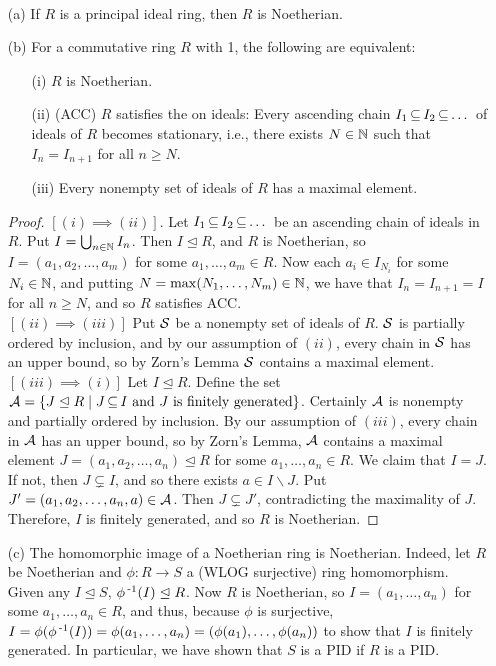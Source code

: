 \documentclass[11pt]{book}
\theoremstyle{definition}   \newtheorem{defn}[counter]{Definition} %
\newcommand{\bs}{\backslash}   \newcommand{\A}{\mathcal{A}}   \newcommand{\sy}{\textnormal{Syl}}   \newcommand{\size}[1]{\left| #1 \right|}
\newcommand{\nsg}{\mathrel{\unlhd}}   \newcommand{\ind}{\parindent24pt}   \newcommand{\vn}{\varnothing}
\DeclareMathOperator{\ra}{\rightarrow}   \DeclareMathOperator{\Poly}{\mathbf{P}}   \DeclareMathOperator{\spn}{\textnormal{span}}   \DeclareMathOperator{\aut}{\textnormal{Aut}}
\numberwithin{counter}{chapter}
\begin{document}
\begin{remark} \
\begin{enumerate}
\item[(a)] If $R$ is a principal ideal ring, then $R$ is Noetherian.
\item[(b)] For a commutative ring $R$ with 1, the following are equivalent:
	\begin{enumerate}
	\item[(i)] $R$ is Noetherian.
	\item[(ii)] (ACC) $R$ satisfies the  on ideals: Every ascending chain $I_1 \operatorname{\subseteq} I_2 \operatorname{\subseteq} \dots$ of ideals of $R$ becomes stationary, i.e., there exists $N \in \operatorname{\mathbb{N}}$ such that $I_n = I_{n+1}$ for all $n \geq N$.
	\item[(iii)] Every nonempty set of ideals of $R$ has a maximal element.
	\end{enumerate}
\begin{proof}
$[(i) \implies (ii)]$. Let $I_1 \operatorname{\subseteq} I_2 \operatorname{\subseteq} \dots$ be an ascending chain of ideals in $R$. Put $I = \bigcup_{n \in \operatorname{\mathbb{N}}} I_n$. Then $I \nsg R$, and $R$ is Noetherian, so $I = (a_1,a_2,\dots,a_m)$ for some $a_1,\dots,a_m \in R$. Now each $a_i \in I_{N_i}$ for some $N_i \in \operatorname{\mathbb{N}}$, and putting $N = \max(N_1,\dots,N_m) \in \operatorname{\mathbb{N}}$, we have that $I_n = I_{n+1} = I$ for all $n \geq N$, and so $R$ satisfies ACC. \\

$[(ii) \implies (iii)]$ Put $\mathcal{S}$ be a nonempty set of ideals of $R$. $\mathcal{S}$ is partially ordered by inclusion, and by our assumption of $(ii)$, every chain in $\mathcal{S}$ has an upper bound, so by Zorn's Lemma $\mathcal{S}$ contains a maximal element. \\

$[(iii) \implies (i)]$ Let $I \nsg R$. Define the set $\mc{A} = \{J \nsg R \mid J \sub I \tn{ and $J$ is finitely generated}\}$. Certainly $\mathcal{A}$ is nonempty and partially ordered by inclusion. By our assumption of $(iii)$, every chain in $\mathcal{A}$ has an upper bound, so by Zorn's Lemma, $\mathcal{A}$ contains a maximal element $J = (a_1,a_2,\dots,a_n) \nsg R$ for some $a_1,\dots,a_n \in R$. We claim that $I = J$. If not, then $J \subsetneq I$, and so there exists $a \in I \bs J$. Put $J' = (a_1,a_2,\dots,a_n,a) \in \mathcal{A}$. Then $J \subsetneq J'$, contradicting the maximality of $J$. Therefore, $I$ is finitely generated, and so $R$ is Noetherian.
\end{proof}

\item[(c)] The homomorphic image of a Noetherian ring is Noetherian. Indeed, let $R$ be Noetherian and $\phi : R \ra S$ a (WLOG surjective) ring homomorphism. Given any $I \nsg S$, $\phi\inv(I) \nsg R$. Now $R$ is Noetherian, so $I = (a_1,\dots,a_n)$ for some $a_1,\dots,a_n \in R$, and thus, because $\phi$ is surjective, $I = \phi(\phi\operatorname{^{-1}}(I)) = \phi(a_1,\dots,a_n) = (\phi(a_1),\dots,\phi(a_n))$ to show that $I$ is finitely generated. In particular, we have shown that $S$ is a PID if $R$ is a PID.
\end{enumerate}
\end{remark}
\end{document}
